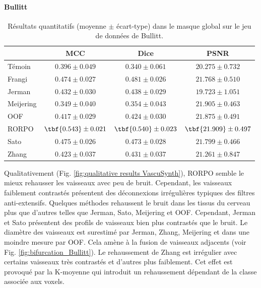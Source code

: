 \paragraph{Bullitt}
\begin{table}[!ht]
  \begin{center}
      \caption{Résultats quantitatifs (moyenne $\pm$ écart-type) dans le masque global \maskglobal sur le jeu de données de Bullitt.}
      \label{tab:quantitative results Bullit}
  \begin{tabular}{lccc}
      \hline
          & MCC & Dice & PSNR \\ 
      \hline
      Témoin	  & $ 0.396 \pm 0.049 $ & $ 0.340 \pm 0.061 $ & $ 20.275 \pm	0.732 $ \\ 
      Frangi	    & $ 0.474 \pm 0.027 $ & $ 0.481 \pm 0.026 $ & $ 21.768 \pm	0.510 $ \\ 
      Jerman	    & $ 0.432 \pm 0.030 $ & $ 0.438 \pm 0.029 $ & $ 19.723 \pm	1.051 $ \\ 
      Meijering	  & $ 0.349 \pm 0.040 $ & $ 0.354 \pm 0.043 $ & $ 21.905 \pm	0.463 $ \\ 
      OOF	        & $ 0.417 \pm 0.029 $ & $ 0.424 \pm 0.030 $ & $ 21.875 \pm	0.491 $ \\ 
      RORPO	      & $ \tbf{0.543} \pm 0.021 $ & $ \tbf{0.540} \pm 0.023 $ & $ \tbf{21.909} \pm	0.497 $ \\ 
      Sato	      & $ 0.475 \pm 0.026 $ & $ 0.473 \pm 0.028 $ & $ 21.799 \pm	0.466 $ \\ 
      Zhang	      & $ 0.423 \pm 0.037 $ & $ 0.431 \pm 0.037 $ & $ 21.261 \pm	0.847 $ \\ 

      \hline
  \end{tabular} 
\end{center}
\end{table}

Qualitativement (Fig. \ref{fig:qualitative results VascuSynth}), RORPO semble le mieux rehausser les vaisseaux avec peu de bruit. Cependant, les vaisseaux faiblement contrastés présentent des déconnexions irrégulières typiques des filtres anti-extensifs. Quelques méthodes rehaussent le bruit dans les tissus du cerveau plus que d'autres telles que Jerman, Sato, Meijering et OOF. Cependant, Jerman et Sato présentent des profils de vaisseaux bien plus contrastés que le bruit. Le diamètre des vaisseaux est surestimé par Jerman, Zhang, Meijering et dans une moindre mesure par OOF. Cela amène à la fusion de vaisseaux adjacents (voir Fig. \ref{fig:bifurcation_Bullitt}). Le rehaussement de Zhang est irrégulier avec certains vaisseaux très contrastés et d'autres plus faiblement. Cet effet est provoqué par la K-moyenne qui introduit un rehaussement dépendant de la classe associée aux voxels.

